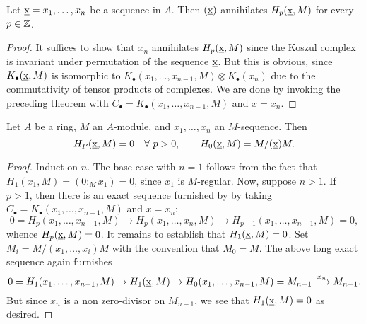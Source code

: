 \begin{corollary}
    Let $\underbar{x} = x_1,\dots,x_n$ be a sequence in $A$. Then $(\underbar{x})$ annihilates $H_p(\underbar{x}, M)$ for every $p\in\mathbb{Z}$.
\end{corollary}
\begin{proof}
    It suffices to show that $x_n$ annihilates $H_p(\underbar{x}, M)$ since the Koszul complex is invariant under permutation of the sequence $\underbar{x}$. But this is obvious, since $K_\bullet(\underbar{x}, M)$ is isomorphic to $K_\bullet(x_1,\dots,x_{n - 1}, M)\otimes K_\bullet(x_n)$ due to the commutativity of tensor products of complexes. We are done by invoking the preceding theorem with $C_\bullet = K_\bullet(x_1,\dots,x_{n - 1}, M)$ and $x = x_n$.
\end{proof}

\begin{theorem}
    Let $A$ be a ring, $M$ an $A$-module, and $x_1,\dots,x_n$ an $M$-sequence. Then 
    \begin{equation*}
        H_P(\underbar{x}, M) = 0\quad\forall~p > 0,\qquad H_0(\underbar{x}, M) = M/(\underbar{x})M.
    \end{equation*}
\end{theorem}
\begin{proof}
    Induct on $n$. The base case with $n = 1$ follows from the fact that $H_1(x_1, M) = (0 :_M x_1) = 0$, since $x_1$ is $M$-regular. Now, suppose $n > 1$. If $p > 1$, then there is an exact sequence furnished by  by taking $C_\bullet = K_\bullet(x_1,\dots,x_{n - 1}, M)$ and $x = x_n$:
    \begin{equation*}
        0 = H_p(x_1,\dots,x_{n - 1}, M)\longrightarrow H_p(x_1,\dots,x_n, M)\longrightarrow H_{p - 1}(x_1,\dots,x_{n - 1}, M) = 0,
    \end{equation*}
    whence $H_p(\underbar{x}, M) = 0$. It remains to establish that $H_1(\underbar{x}, M) = 0$. Set $M_i = M/(x_1,\dots,x_i)M$ with the convention that $M_0 = M$. The above long exact sequence again furnishes 
    \begin{equation*}
        0 = H_1(x_1,\dots,x_{n - 1}, M)\to H_1(\underbar{x}, M)\to H_0(x_1,\dots,x_{n - 1}, M) = M_{n - 1}\xrightarrow{x_n} M_{n - 1}.
    \end{equation*}
    But since $x_n$ is a non zero-divisor on $M_{n - 1}$, we see that $H_1(\underbar{x}, M) = 0$ as desired.
\end{proof}

